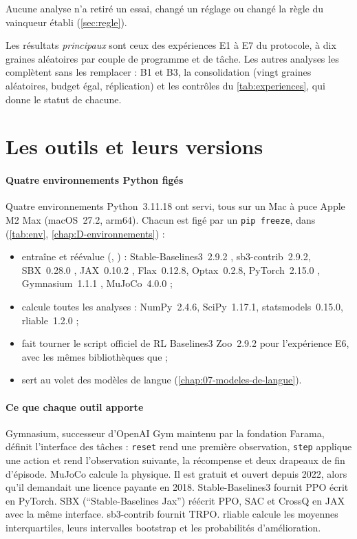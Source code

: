 Aucune analyse n'a retiré un essai, changé un réglage ou changé la règle du vainqueur établi
(\cref{sec:regle}).

Les résultats \emph{principaux} sont ceux des expériences E1 à E7 du protocole, à dix graines aléatoires par
couple de programme et de tâche. Les autres analyses les complètent sans les remplacer : B1 et B3, la
consolidation (vingt graines aléatoires, budget égal, réplication) et les contrôles du
\cref{tab:experiences}, qui donne le statut de chacune.

\section{Les outils et leurs versions}\label{sec:outils}

\paragraph{Quatre environnements Python figés}
Quatre environnements Python~3.11.18 ont servi, tous sur un Mac à puce Apple M2 Max (macOS~27.2, arm64).
Chacun est figé par un \texttt{pip freeze}, dans  (\cref{tab:env},
\cref{chap:D-environnements}) :
\begin{itemize}
  \item {} entraîne et réévalue (, ) : Stable-Baselines3~2.9.2
    \parencite{raffin2021sb3}, sb3-contrib~2.9.2, SBX~0.28.0 \parencite{raffin2023sbx}, JAX~0.10.2
    \parencite{bradbury2018jax}, Flax~0.12.8, Optax~0.2.8, PyTorch~2.15.0 \parencite{paszke2019pytorch},
    Gymnasium~1.1.1 \parencite{towers2024gymnasium}, MuJoCo~4.0.0 \parencite{todorov2012mujoco} ;
  \item {} calcule toutes les analyses : NumPy~2.4.6, SciPy~1.17.1, statsmodels~0.15.0,
    rliable~1.2.0 \parencite{agarwal2021precipice} ;
  \item {} fait tourner le script officiel de RL Baselines3 Zoo~2.9.2 \parencite{raffin2020zoo}
    pour l'expérience E6, avec les mêmes bibliothèques que  ;
  \item {} sert au volet des modèles de langue (\cref{chap:07-modeles-de-langue}).
\end{itemize}

\paragraph{Ce que chaque outil apporte}
Gymnasium, successeur d'OpenAI Gym maintenu par la fondation Farama, définit l'interface des tâches :
\texttt{reset} rend une première observation, \texttt{step} applique une action et rend l'observation
suivante, la récompense et deux drapeaux de fin d'épisode. MuJoCo calcule la physique. Il est gratuit et
ouvert depuis 2022, alors qu'il demandait une licence payante en 2018. Stable-Baselines3 fournit PPO écrit en
PyTorch. SBX (\enquote{Stable-Baselines Jax}) réécrit PPO, SAC et CrossQ en JAX avec la même interface.
sb3-contrib fournit TRPO. rliable calcule les moyennes interquartiles, leurs intervalles bootstrap et les
probabilités d'amélioration.

